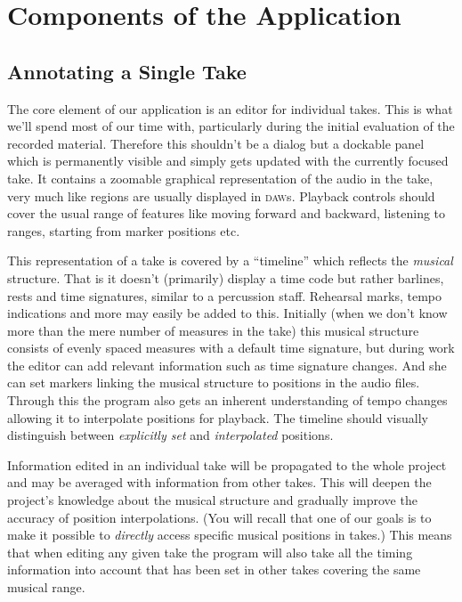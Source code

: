 \documentclass[11pt,a4paper]{article}
\begin{document}
\section{Components of the Application}

\subsection{Annotating a Single Take}
The core element of our application is an editor for individual takes.
This is what we'll spend most of our time with, particularly during the initial evaluation of the recorded material.
Therefore this shouldn't be a dialog but a dockable panel which is permanently visible and simply gets updated with the currently focused take.
It contains a zoomable graphical representation of the audio in the take, very much like regions are usually displayed in \textsc{daw}s.
Playback controls should cover the usual range of features like moving forward and backward, listening to ranges, starting from marker positions etc.

This representation of a take is covered by a “timeline” which reflects the \emph{musical} structure.
That is it doesn't (primarily) display a time code but rather barlines, rests and time signatures, similar to a percussion staff.
Rehearsal marks, tempo indications and more may easily be added to this.
Initially (when we don't know more than the mere number of measures in the take) this musical structure consists of evenly spaced measures with a default time signature, but during work the editor can add relevant information such as time signature changes.
And she can set markers linking the musical structure to positions in the audio files.
Through this the program also gets an inherent understanding of tempo changes allowing it to interpolate positions for playback.
The timeline should visually distinguish between \emph{explicitly set} and \emph{interpolated} positions.

Information edited in an individual take will be propagated to the whole project and may be averaged with information from other takes.
This will deepen the project's knowledge about the musical structure and gradually improve the accuracy of position interpolations.
(You will recall that one of our goals is to make it possible to \emph{directly} access specific musical positions in takes.)
This means that when editing any given take the program will also take all the timing information into account that has been set in other takes covering the same musical range.
\end{document}
